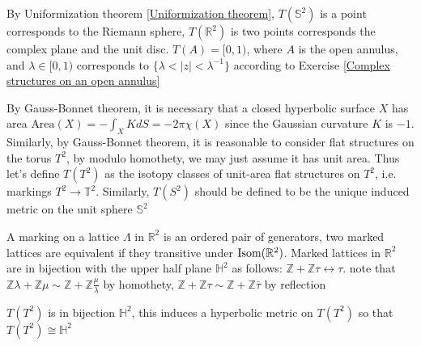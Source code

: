 \documentclass[main]{subfiles}
\begin{document}
\begin{example}
By Uniformization theorem \ref{Uniformization theorem}, $T(\mathbb S^2)$ is a point corresponds to the Riemann sphere, $T(\mathbb R^2)$ is two points corresponds the complex plane and the unit disc. $T(A)=[0,1)$, where $A$ is the open annulus, and $\lambda\in[0,1)$ corresponds to $\{\lambda<|z|<\lambda^{-1}\}$ according to Exercise \ref{Complex structures on an open annulus}
\end{example}

By Gauss-Bonnet theorem, it is necessary that a closed hyperbolic surface $X$ has area $\text{Area}(X)=-\int_XKdS=-2\pi\chi(X)$ since the Gaussian curvature $K$ is $-1$. Similarly, by Gauss-Bonnet theorem, it is reasonable to consider flat structures on the torus $T^2$, by modulo homothety, we may just assume it has unit area. Thus let's define $T(T^2)$ as the isotopy classes of unit-area flat structures on $T^2$, i.e. markings $T^2\to\mathbb T^2$. Similarly, $T(S^2)$ should be defined to be the unique induced metric on the unit sphere $\mathbb S^2$

A marking on a lattice $\Lambda$ in $\mathbb R^2$ is an ordered pair of generators, two marked lattices are equivalent if they transitive under $\operatorname{Isom}(\mathbb R^2)$. Marked lattices in $\mathbb R^2$ are in bijection with the upper half plane $\mathbb H^2$ as follows: $\mathbb Z+\mathbb Z\tau\leftrightarrow\tau$. note that $\mathbb Z\lambda+\mathbb Z\mu\sim\mathbb Z+\mathbb Z\frac{\mu}{\lambda}$ by homothety, $\mathbb Z+\mathbb Z\tau\sim\mathbb Z+\mathbb Z\bar\tau$ by reflection

\begin{proposition}
$T(T^2)$ is in bijection $\mathbb H^2$, this induces a hyperbolic metric on $T(T^2)$ so that $T(T^2)\cong\mathbb H^2$
\end{proposition}
\end{document}
